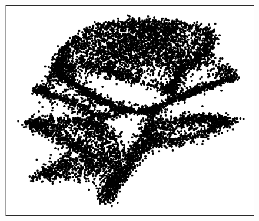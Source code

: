 \documentclass{article}
\theoremstyle{remark}
\theoremstyle{plain}
\begin{document}
{\begin{figure}[!t]
\begin{minipage}{.15\textwidth}
        \label{fig_IGNN_rose}
    \end{minipage}
    \begin{minipage}{.15\textwidth}
        \centering
        \includegraphics[width=\textwidth]{Img_rose_ScoreSDE.png}
        \label{fig_scoresde_rose}
    \end{minipage}


\end{figure}}
\end{document}
